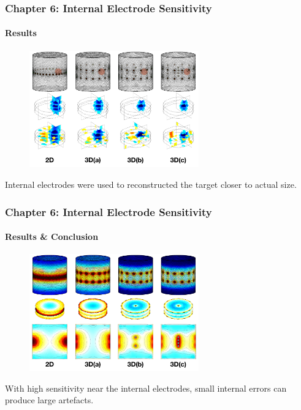 \documentclass[10pt,    %
    english,            %
    xcolor=table,       %
    envcountsect,        %
    aspectratio=1610
]{beamer}
\begin{document}
\begin{frame}
	\frametitle{Chapter 6: Internal Electrode Sensitivity}
	\framesubtitle{Results}
	\begin{figure}[H]
		\centering
		\includegraphics[width=0.65\textwidth,trim={0 0.5cm 0 0cm},clip]{Image_Comparison.pdf}
	\end{figure}%
	Internal electrodes were used to reconstructed the target closer to actual size.
\end{frame}

\begin{frame}
	\frametitle{Chapter 6: Internal Electrode Sensitivity}
	\framesubtitle{Results \& Conclusion}
	\begin{figure}[H]
		\centering
		\includegraphics[width=0.65\textwidth,trim={0 0.5cm 0 0cm},clip]{Sensitivity_Comparison_new.pdf}
	\end{figure}%
	With high sensitivity near the internal electrodes, small internal errors can produce large artefacts.
\end{frame}
\end{document}

